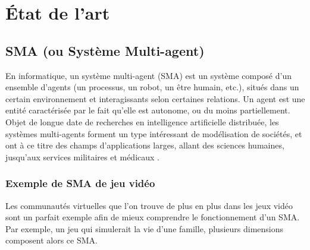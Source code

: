 
\chapter{État de l'art} %

\label{Chapter3} %


\section{SMA (ou Système Multi-agent)}

En informatique, un système multi-agent (SMA) est un système composé d'un ensemble d'agents (un processus, un robot, un être humain, etc.), situés dans un certain environnement et interagissants selon certaines relations. Un agent est une entité caractérisée par le fait qu'elle est autonome, ou du moins partiellement.
Objet de longue date de recherches en intelligence artificielle distribuée, les systèmes multi-agents forment un type intéressant de modélisation de sociétés, et ont à ce titre des champs d'applications larges, allant des sciences humaines, jusqu’aux services militaires et médicaux \parencite{sma}.


\subsection{Exemple de SMA de jeu vidéo}

Les communautés virtuelles que l’on trouve de plus en plus dans les jeux vidéo sont un parfait exemple afin de mieux comprendre le fonctionnement d’un SMA. Par exemple, un jeu qui simulerait la vie d’une famille, plusieurs dimensions composent alors ce SMA.

